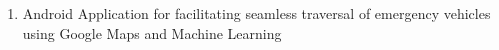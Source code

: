 \documentclass[10pt]{article}
\begin{document}
\begin{minipage}{0.95\textwidth}
{{\begin{enumerate}
\color{black} \item Android Application for facilitating seamless traversal of emergency vehicles using Google Maps and Machine Learning\\




\end{enumerate}
}}
\vspace{2mm}
\end{minipage}
\end{document}
